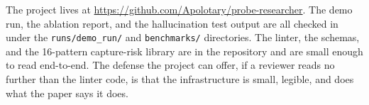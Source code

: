 The project lives at \url{https://github.com/Apolotary/probe-researcher}. The demo run, the ablation report, and the hallucination test output are all checked in under the \texttt{runs/demo\_run/} and \texttt{benchmarks/} directories. The linter, the schemas, and the 16-pattern capture-risk library are in the repository and are small enough to read end-to-end. The defense the project can offer, if a reviewer reads no further than the linter code, is that the infrastructure is small, legible, and does what the paper says it does.
